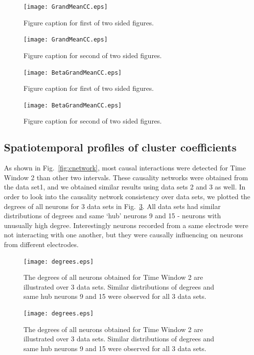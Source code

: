 \documentclass[a4paper]{jpconf}
\begin{document}
\begin{figure}[h]
\begin{minipage}{14pc}
\texttt{[image: GrandMeanCC.eps]}
\caption{\label{label}Figure caption for first of two sided figures.}
\end{minipage}\hspace{4pc}%
\begin{minipage}{14pc}
\texttt{[image: GrandMeanCC.eps]}
\caption{\label{label}Figure caption for second of two sided figures.}
\end{minipage} 

\begin{minipage}{14pc}
\texttt{[image: BetaGrandMeanCC.eps]}
\caption{\label{label}Figure caption for first of two sided figures.}
\end{minipage}\hspace{4pc}%
\begin{minipage}{14pc}
\texttt{[image: BetaGrandMeanCC.eps]}
\caption{\label{label}Figure caption for second of two sided figures.}
\end{minipage} 

\end{figure}


\subsection{Spatiotemporal profiles of cluster coefficients}

As shown in Fig.~\ref{fig:cnetwork}, most causal interactions were
detected for Time Window 2 than other two intervals. These
causality networks were obtained from the data set1, and we
obtained similar results using data sets 2 and 3 as well. In order
to look into the causality network consistency over data sets, we
plotted the degrees of all neurons for 3 data sets in
Fig.~\ref{fig:degree}.  All data sets had similar distributions of
degrees and same `hub' neurons 9 and 15 - neurons with unusually
high degree. Interestingly neurons recorded from a same electrode
were not interacting with one another, but they were causally
influencing on neurons from different electrodes.

\begin{figure}[ht!]
\begin{center}
\texttt{[image: degrees.eps]}
\end{center}
\caption{The degrees of all neurons obtained for Time Window 2 are
illustrated over 3 data sets. Similar distributions of degrees and
same hub neurons 9 and 15 were observed for all 3 data sets.}
\label{fig:degree}
\end{figure}
\begin{figure}[ht!]
\begin{center}
\texttt{[image: degrees.eps]}
\end{center}
\caption{The degrees of all neurons obtained for Time Window 2 are
illustrated over 3 data sets. Similar distributions of degrees and
same hub neurons 9 and 15 were observed for all 3 data sets.}
\label{fig:degree}
\end{figure}
\end{document}
